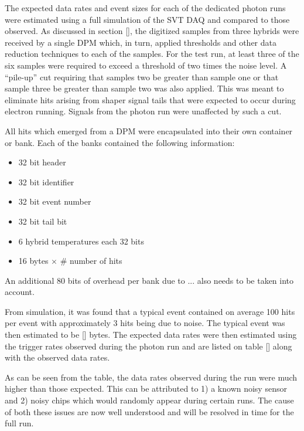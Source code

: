 
%
%

The expected data rates and event sizes for each of the dedicated photon runs
were estimated using a full simulation of the SVT DAQ and compared to those
observed.  As discussed in 
section [], the digitized samples from three hybrids were received by a single
DPM which, in turn, applied thresholds and other data reduction techniques to 
each of the samples.  For the test run, at least three of the six samples
were required to exceed a threshold of two times the noise level.  A 
``pile-up'' cut requiring that samples two be greater than sample one or that
sample three be greater than sample two was also applied.  This was meant
to eliminate hits arising from shaper signal tails that were expected to occur 
during electron running.  Signals from the photon run were unaffected by such
a cut. 

All hits which emerged from a DPM were encapsulated into their own container 
or bank. Each of the banks contained the following information:
\begin{itemize}
    \item 32 bit header
    \item 32 bit identifier
    \item 32 bit event number
    \item 32 bit tail bit
    \item 6 hybrid temperatures each 32 bits
    \item 16 bytes $\times$ \# number of hits 
\end{itemize} 
An additional 80 bits of overhead per bank due to ... also needs to be taken 
into account.

From simulation, it was found that a typical event contained on average 100
hits per event with approximately 3 hits being due to noise.  The typical 
event was then estimated to be [] bytes.  The expected data rates
were then estimated using the trigger rates observed during the photon
run and are listed on table [] along with the observed data rates.  
\begin{table}
    \caption{...}
    \label{table:rates}
\end{table}

As can be seen from the table, the data rates observed during the run were
much higher than those expected.  This can be attributed to 1) a known
noisy sensor and 2) noisy chips which would randomly appear during certain
runs.  The cause of both these issues are now well understood and will be
resolved in time for the full run.

